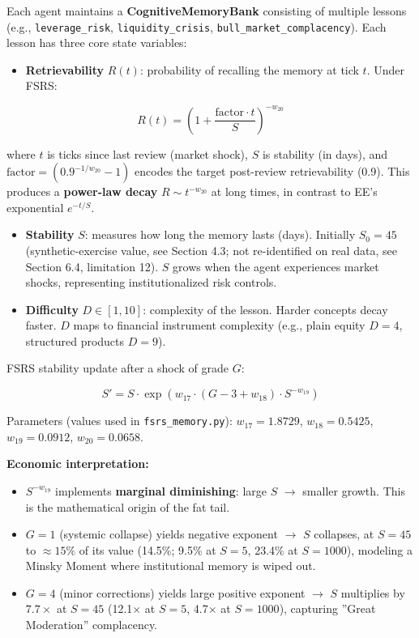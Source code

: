 \documentclass[11pt]{article}
\begin{document}
Each agent maintains a \textbf{CognitiveMemoryBank} consisting of multiple lessons (e.g., \texttt{leverage\_risk}, \texttt{liquidity\_crisis}, \texttt{bull\_market\_complacency}). Each lesson has three core state variables:

\begin{itemize}
\item \textbf{Retrievability} $R(t)$: probability of recalling the memory at tick $t$. Under FSRS:
\end{itemize}

\[
R(t) = \left(1 + \frac{\text{factor} \cdot t}{S}\right)^{-w_{20}}
\]

where $t$ is ticks since last review (market shock), $S$ is stability (in days), and $\text{factor} = (0.9^{-1/w_{20}} - 1)$ encodes the target post-review retrievability (0.9). This produces a \textbf{power-law decay} $R \sim t^{-w_{20}}$ at long times, in contrast to EE's exponential $e^{-t/S}$.

\begin{itemize}
\item \textbf{Stability} $S$: measures how long the memory lasts (days). Initially $S_0 = 45$ (synthetic-exercise value, see Section 4.3; not re-identified on real data, see Section 6.4, limitation 12). $S$ grows when the agent experiences market shocks, representing institutionalized risk controls.
\end{itemize}

\begin{itemize}
\item \textbf{Difficulty} $D \in [1,10]$: complexity of the lesson. Harder concepts decay faster. $D$ maps to financial instrument complexity (e.g., plain equity $D=4$, structured products $D=9$).
\end{itemize}

FSRS stability update after a shock of grade $G$:

\[
S' = S \cdot \exp\left( w_{17} \cdot (G - 3 + w_{18}) \cdot S^{-w_{19}} \right)
\]

Parameters (values used in \texttt{fsrs\_memory.py}): $w_{17}=1.8729$, $w_{18}=0.5425$, $w_{19}=0.0912$, $w_{20}=0.0658$.

\textbf{Economic interpretation:}

\begin{itemize}
\item $S^{-w_{19}}$ implements \textbf{marginal diminishing}: large $S$ $\rightarrow$ smaller growth. This is the mathematical origin of the fat tail.
\item $G=1$ (systemic collapse) yields negative exponent $\rightarrow$ $S$ collapses, at $S=45$ to $\approx 15\%$ of its value (14.5\%; 9.5\% at $S=5$, 23.4\% at $S=1000$), modeling a Minsky Moment where institutional memory is wiped out.
\item $G=4$ (minor corrections) yields large positive exponent $\rightarrow$ $S$ multiplies by $7.7\times$ at $S=45$ (12.1$\times$ at $S=5$, 4.7$\times$ at $S=1000$), capturing ''Great Moderation'' complacency.
\end{itemize}
\end{document}
